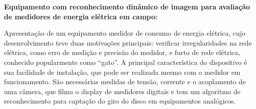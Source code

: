 
\textbf{Equipamento com reconhecimento dinâmico de imagem para avaliação de
medidores de energia elétrica em campo:}

Apresentação de um equipamento medidor de consumo de energia elétrica, cujo
desenvolvimento teve duas motivações principais: verificar irregularidades na
rede elétrica, como erro de medição e precisão do medidor, e furto de rede
elétrica, conhecido popularmente como ``gato''. A principal característica do
dispositivo é sua facilidade de instalação, que pode ser realizada mesmo
com o medidor em funcionamento. São necessárias medidas de tensão, corrente e o
acoplamento de uma câmera, que filma o display de medidores digitais e tem um
algoritmo de reconhecimento para captação do giro do disco em equipamentos
analógicos.
